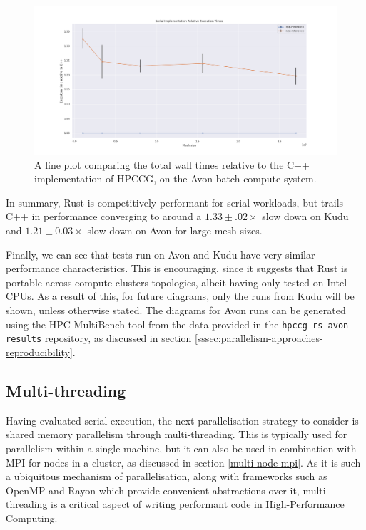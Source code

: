\begin{figure}[H]
    \centering
    \includegraphics[width=\textwidth]{images/5_performance/parallelism/2_serial_line_relative_avon.png}
    \caption{A line plot comparing the total wall times relative to the C++ implementation of HPCCG, on the Avon batch compute system.}
    \label{fig:2_serial_line_relative_avon}
\end{figure}


In summary, Rust is competitively performant for serial workloads, but trails C++ in performance converging to around a $1.33 \pm .02 \times$ slow down on Kudu and $1.21 \pm 0.03 \times$ slow down on Avon for large mesh sizes.

Finally, we can see that tests run on Avon and Kudu have very similar performance characteristics. This is encouraging, since it suggests that Rust is portable across compute clusters topologies, albeit having only tested on Intel CPUs. As a result of this, for future diagrams, only the runs from Kudu will be shown, unless otherwise stated. The diagrams for Avon runs can be generated using the HPC MultiBench tool from the data provided in the \texttt{hpccg-rs-avon-results} repository, as discussed in section \ref{sssec:parallelism-approaches-reproducibility}.

\subsection{Multi-threading}
\label{ssec:multi-threaded}

Having evaluated serial execution, the next parallelisation strategy to consider is shared memory parallelism through multi-threading. This is typically used for parallelism within a single machine, but it can also be used in combination with MPI for nodes in a cluster, as discussed in section \ref{multi-node-mpi}. As it is such a ubiquitous mechanism of parallelisation, along with frameworks such as OpenMP and Rayon which provide convenient abstractions over it, multi-threading is a critical aspect of writing performant code in High-Performance Computing.

